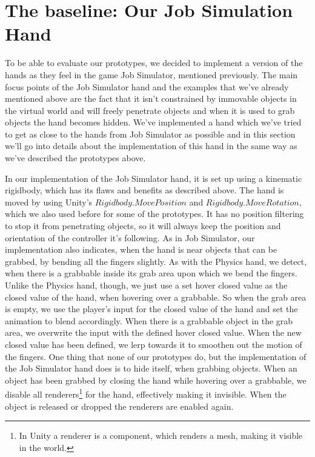 \section{The baseline: Our Job Simulation Hand}
To be able to evaluate our prototypes, we decided to implement a version of the hands as they feel in the game Job Simulator, mentioned previously. The main focus points of the Job Simulator hand and the examples that we've already mentioned above are the fact that it isn't constrained by immovable objects in the virtual world and will freely penetrate objects and when it is used to grab objects the hand becomes hidden. We've implemented a hand which we've tried to get as close to the hands from Job Simulator as possible and in this section we'll go into details about the implementation of this hand in the same way as we've described the prototypes above.

In our implementation of the Job Simulator hand, it is set up using a kinematic rigidbody, which has its flaws and benefits as described above. The hand is moved by using Unity's $Rigidbody.MovePosition$ and $Rigidbody.MoveRotation$, which we also used before for some of the prototypes. It has no position filtering to stop it from penetrating objects, so it will always keep the position and orientation of the controller it's following. As in Job Simulator, our implementation also indicates, when the hand is near objects that can be grabbed, by bending all the fingers slightly. As with the Physics hand, we detect, when there is a grabbable inside its grab area upon which we bend the fingers. Unlike the Physics hand, though, we just use a set hover closed value as the closed value of the hand, when hovering over a grabbable. So when the grab area is empty, we use the player's input for the closed value of the hand and set the animation to blend accordingly. When there is a grabbable object in the grab area, we overwrite the input with the defined hover closed value. When the new closed value has been defined, we lerp towards it to smoothen out the motion of the fingers. One thing that none of our prototypes do, but the implementation of the Job Simulator hand does is to hide itself, when grabbing objects. When an object has been grabbed by closing the hand while hovering over a grabbable, we disable all renderers\footnote{In Unity a renderer is a component, which renders a mesh, making it visible in the world.} for the hand, effectively making it invisible. When the object is released or dropped the renderers are enabled again.

